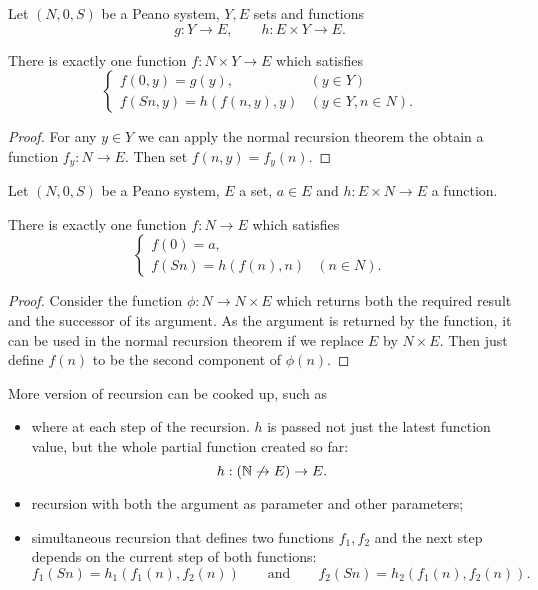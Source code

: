 \begin{corollary}
Let $(N,0,S)$ be a Peano system, $Y,E$ sets and functions
\[ g: Y\to E,\qquad h:E\times Y\to E. \]

There is exactly one function $f: N\times Y\to E$ which satisfies
\[ \begin{cases}
f(0,y) = g(y), & (y\in Y) \\
f(Sn,y) = h(f(n,y),y) & (y\in Y, n\in N).
\end{cases} \]
\end{corollary}
\begin{proof}
For any $y\in Y$ we can apply the normal recursion theorem the obtain a function $f_y: N\to E$. Then set $f(n,y) = f_y(n)$.
\end{proof}
\begin{corollary}
Let $(N,0,S)$ be a Peano system, $E$ a set, $a\in E$ and $h: E\times N\to E$ a function.

There is exactly one function $f: N\to E$ which satisfies
\[ \begin{cases}
f(0) = a, \\
f(Sn) = h(f(n),n) & (n\in N).
\end{cases} \]
\end{corollary}
\begin{proof}
Consider the function $\phi: N \to N\times E$ which returns both the required result and the successor of its argument. As the argument is returned by the function, it can be used in the normal recursion theorem if we replace $E$ by $N\times E$. Then just define $f(n)$ to be the second component of $\phi(n)$.
\end{proof}
More version of recursion can be cooked up, such as
\begin{itemize}
\item {} where at each step of the recursion. $h$ is passed not just the latest function value, but the whole partial function created so far:
\[ h: (\mathbb{N} \not\to E)\to E. \]
\item recursion with both the argument as parameter and other parameters;
\item simultaneous recursion that defines two functions $f_1,f_2$ and the next step depends on the current step of both functions:
\[ f_1(Sn) = h_1(f_1(n),f_2(n)) \qquad \text{and}\qquad f_2(Sn) = h_2(f_1(n),f_2(n)). \]
\end{itemize}

